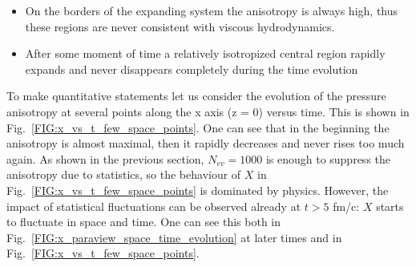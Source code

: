 \begin{itemize}
  \item On the borders of the expanding system the anisotropy is always high,
        thus these regions are never consistent with viscous hydrodynamics.
  \item After some moment of time a relatively isotropized central region
        rapidly expands and never disappears completely during the time evolution
\end{itemize}

To make quantitative statements let us consider the evolution of the pressure
anisotropy at several points along the x axis (z = 0) versus time. This is shown
in Fig.~\ref{FIG:x_vs_t_few_space_points}. One can see that in the beginning the
anisotropy is almost maximal, then it rapidly decreases and never rises too much
again. As shown in the previous section, $N_{ev} = 1000$ is enough to
suppress the anisotropy due to statistics, so the behaviour of $X$ in
Fig.~\ref{FIG:x_vs_t_few_space_points} is dominated by physics. However, the
impact of statistical fluctuations can be observed already at $t > 5$ fm/c: $X$
starts to fluctuate in space and time. One can see this both in
Fig.~\ref{FIG:x_paraview_space_time_evolution} at later times and in
Fig.~\ref{FIG:x_vs_t_few_space_points}.

